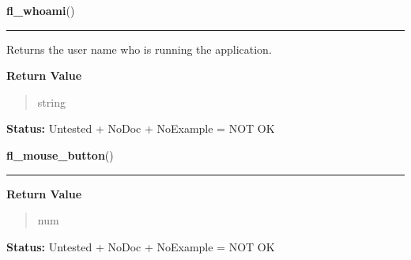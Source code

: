     \label{xformslib:library:fl_whoami}

    \vspace{0.5ex}

\hspace{.8\funcindent}\begin{boxedminipage}{\funcwidth}

    \raggedright \textbf{fl\_whoami}()

    \vspace{-1.5ex}

    \rule{\textwidth}{0.5\fboxrule}
\setlength{\parskip}{2ex}
    Returns the user name who is running the application.

\setlength{\parskip}{1ex}
      \textbf{Return Value}
    \vspace{-1ex}

      \begin{quote}
      string

      \end{quote}

\textbf{Status:} Untested + NoDoc + NoExample = NOT OK



    \end{boxedminipage}

    \label{xformslib:library:fl_mouse_button}

    \vspace{0.5ex}

\hspace{.8\funcindent}\begin{boxedminipage}{\funcwidth}

    \raggedright \textbf{fl\_mouse\_button}()

    \vspace{-1.5ex}

    \rule{\textwidth}{0.5\fboxrule}
\setlength{\parskip}{2ex}
\setlength{\parskip}{1ex}
      \textbf{Return Value}
    \vspace{-1ex}

      \begin{quote}
      num

      \end{quote}

\textbf{Status:} Untested + NoDoc + NoExample = NOT OK



    \end{boxedminipage}

